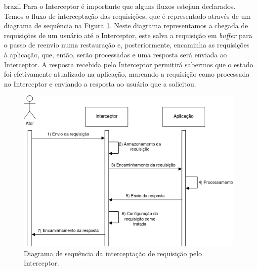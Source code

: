 \begin{otherlanguage*}{brazil}
Para o Interceptor é importante que alguns fluxos estejam declarados. Temos o fluxo de
interceptação das requisições, que é representado através de um diagrama de sequência na
Figura \ref{fig:interceptor-request-interception}. Neste diagrama representamos a chegada
de requisições de um usuário até o Interceptor, este salva a requisição em \textit{buffer} para
o passo de reenvio numa restauração e, posteriormente, encaminha as requisições à aplicação,
que, então, serão processadas e uma resposta será enviada ao Interceptor. A resposta
recebida pelo Interceptor permitirá sabermos que o estado foi efetivamente atualizado
na aplicação, marcando a requisição como processada no Interceptor e enviando a resposta ao
usuário que a solicitou.

\begin{figure}[h]
\centering
\includegraphics[scale=0.46]{images/interceptor-intercept.png}
\caption{Diagrama de sequência da interceptação de requisição pelo Interceptor.}
\label{fig:interceptor-request-interception}
\end{figure}


\end{otherlanguage*}
